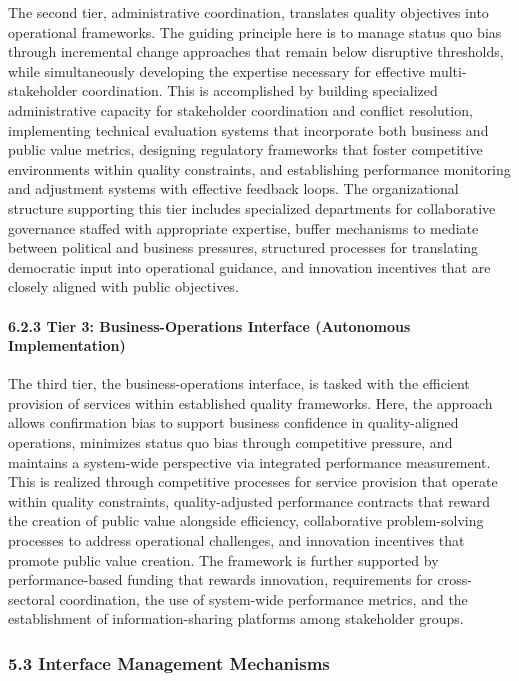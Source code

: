 The second tier, administrative coordination, translates quality objectives into operational frameworks. The guiding principle here is to manage status quo bias through incremental change approaches that remain below disruptive thresholds, while simultaneously developing the expertise necessary for effective multi-stakeholder coordination. This is accomplished by building specialized administrative capacity for stakeholder coordination and conflict resolution, implementing technical evaluation systems that incorporate both business and public value metrics, designing regulatory frameworks that foster competitive environments within quality constraints, and establishing performance monitoring and adjustment systems with effective feedback loops. The organizational structure supporting this tier includes specialized departments for collaborative governance staffed with appropriate expertise, buffer mechanisms to mediate between political and business pressures, structured processes for translating democratic input into operational guidance, and innovation incentives that are closely aligned with public objectives.

\paragraph{6.2.3 Tier 3: Business-Operations Interface (Autonomous Implementation)}\label{tier-3-business-operations-interface-autonomous-implementation}

The third tier, the business-operations interface, is tasked with the efficient provision of services within established quality frameworks. Here, the approach allows confirmation bias to support business confidence in quality-aligned operations, minimizes status quo bias through competitive pressure, and maintains a system-wide perspective via integrated performance measurement. This is realized through competitive processes for service provision that operate within quality constraints, quality-adjusted performance contracts that reward the creation of public value alongside efficiency, collaborative problem-solving processes to address operational challenges, and innovation incentives that promote public value creation. The framework is further supported by performance-based funding that rewards innovation, requirements for cross-sectoral coordination, the use of system-wide performance metrics, and the establishment of information-sharing platforms among stakeholder groups.

\subsubsection{5.3 Interface Management Mechanisms}\label{interface-management-mechanisms}

